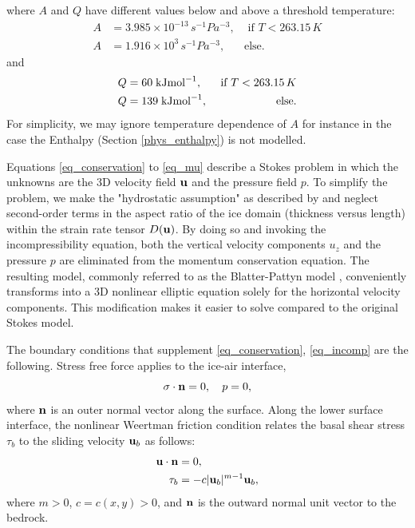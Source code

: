 \documentclass[10pt,twocolumn]{article}
\begin{document}
where $A$ and $Q$ have different values below and above a threshold temperature:
\begin{align}
A & = 3.985 \times 10^{-13} \, s^{-1} Pa^{-3}, & \textrm{ if } T <263.15 \, K \label{A1} \\
A & = 1.916 \times 10^3 \, s^{-1} Pa^{-3}, & \textrm{else.} \label{A2} 
\end{align}
and
\begin{align}
Q & =  60 \; {\rm kJ mol}^{-1}, & \textrm{ if } T <263.15 \, K \\
Q & = 139 \; {\rm kJ mol}^{-1}, & \textrm{else.}
\end{align}
For simplicity, we may ignore temperature dependence of $A$ for instance in the 
case the Enthalpy (Section \ref{phys_enthalpy}) is not modelled.
 
Equations \eqref{eq_conservation} to \eqref{eq_mu} describe a Stokes problem in which 
the unknowns are the 3D velocity field ${\bf u}$ and the pressure field $p$. 
To simplify the problem, we make the "hydrostatic assumption" as described by  \citep{Blatter1995}
and neglect second-order terms in the aspect ratio of the ice domain (thickness versus length) 
within the strain rate tensor $D({\bf u})$. By doing so and invoking the incompressibility equation, 
both the vertical velocity components $u_z$ and the pressure $p$ are eliminated from the 
momentum conservation equation.
The resulting model, commonly referred to as the Blatter-Pattyn model
\citep{Blatter1995}, conveniently transforms into a 3D nonlinear elliptic equation solely 
for the horizontal velocity components. This modification makes it easier to solve compared 
to the original Stokes model.

The boundary conditions that supplement \eqref{eq_conservation}, \eqref{eq_incomp} 
are the following. Stress free force applies to the ice-air interface,
\begin{equation}
\sigma \cdot {\bf n} = 0, \quad p = 0,  \label{BC_FS}
\end{equation}
where ${\bf n}$
is an outer normal vector along the surface. Along the lower surface interface, 
the nonlinear Weertman friction condition \citep[e.g.,][]{SchoofHewitt2013}
relates the basal shear stress $\tau_b$ to the sliding velocity ${\bf u}_b$ as follows:
\begin{align}
{\bf u} \cdot {\bf n} &= 0,  \label{BC_slip1} \\ 
\tau_b & = -  c |{\bf u}_b|^{m-1} {\bf u}_b, \label{BC_slip2a}
\end{align} 
where $m>0$, $c=c(x,y) > 0$, and ${\bf n}$ is the outward normal unit vector to the bedrock.
\end{document}
